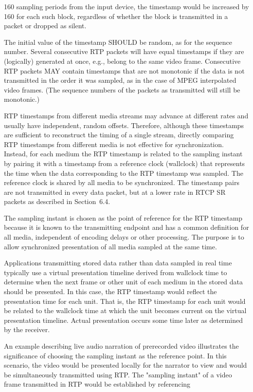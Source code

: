 \documentclass{article}
\begin{document}
160 sampling periods from the input device, the timestamp would be increased by 160 for each such block, regardless of whether the block is transmitted in a packet or dropped as silent.

The initial value of the timestamp SHOULD be random, as for the sequence number.  Several consecutive RTP packets will have equal timestamps if they are (logically) generated at once, e.g., belong to the same video frame.  Consecutive RTP packets MAY contain timestamps that are not monotonic if the data is not transmitted in the order it was sampled, as in the case of MPEG interpolated video frames.  (The sequence numbers of the packets as transmitted will still be monotonic.)

RTP timestamps from different media streams may advance at different rates and usually have independent, random offsets. Therefore, although these timestamps are sufficient to reconstruct the timing of a single stream, directly comparing RTP timestamps from different media is not effective for synchronization. Instead, for each medium the RTP timestamp is related to the sampling instant by pairing it with a timestamp from a reference clock (wallclock) that represents the time when the data corresponding to the RTP timestamp was sampled.  The reference clock is shared by all media to be synchronized.  The timestamp pairs are not transmitted in every data packet, but at a lower rate in RTCP SR packets as described in Section~6.4.

The sampling instant is chosen as the point of reference for the RTP timestamp because it is known to the transmitting endpoint and has a common definition for all media, independent of encoding delays or other processing.  The purpose is to allow synchronized presentation of all media sampled at the same time.

Applications transmitting stored data rather than data sampled in real time typically use a virtual presentation timeline derived from wallclock time to determine when the next frame or other unit of each medium in the stored data should be presented.  In this case, the RTP timestamp would reflect the presentation time for each unit.  That is, the RTP timestamp for each unit would be related to the wallclock time at which the unit becomes current on the virtual presentation timeline.  Actual presentation occurs some time later as determined by the receiver.

An example describing live audio narration of prerecorded video illustrates the significance of choosing the sampling instant as the reference point.  In this scenario, the video would be presented locally for the narrator to view and would be simultaneously transmitted using RTP.  The "sampling instant" of a video frame transmitted in RTP would be established by referencing
\end{document}

